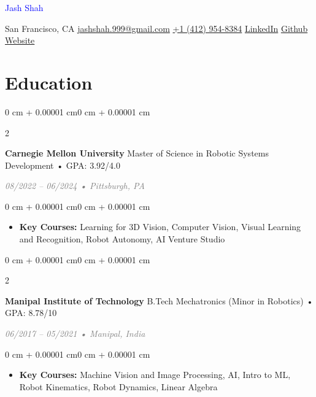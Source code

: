 \documentclass[10pt, a4paper]{article}
\newcommand{\customsection}[1]{%
    \section*{%
        \textbf{%
            \fontsize{11pt}{11pt}\selectfont
            \color{Blue}#1%
        }%
        \hspace{0.5em}\color{Blue}\hrulefill%
    }%
    \vspace{0.03cm}%
}
\newenvironment{highlights}{
    \begingroup
    \fontsize{9.3pt}{10.8pt}\selectfont
    \begin{itemize}[
        topsep=0.03cm,
        parsep=0.03cm,
        partopsep=0pt,
        itemsep=0pt,
        leftmargin=0cm + 8pt
    ]
}{
    \end{itemize}
    \endgroup
}
\newenvironment{onecolentry}{
    \begin{adjustwidth}{0 cm + 0.00001 cm}{0 cm + 0.00001 cm}
}{
    \end{adjustwidth}
}
\newenvironment{twocolentry}[2][]{
    \onecolentry
    \def\secondColumn{#2}
    \setcolumnwidth{\fill, 6.0 cm}
    \begin{paracol}{2}
}{
    \switchcolumn \raggedleft \secondColumn
    \end{paracol}
    \endonecolentry
}
\newenvironment{header}{
    \setlength{\topsep}{0pt}\par\kern\topsep\centering\linespread{0.8}
}{
    \par\kern\topsep
}
\begin{document}
    \begin{header}
        \fontsize{15pt}{15pt}\selectfont \textcolor{Blue}{Jash Shah}

        \vspace{5pt}

        \normalsize

        San Francisco, CA
        \textbullet{} \href{mailto:jashshah.999@gmail.com}{jashshah.999@gmail.com}
        \textbullet{} \href{tel:+14129548384}{+1 (412) 954-8384}
        \textbullet{} \href{https://linkedin.com/in/jash-shah-2b790146}{LinkedIn}
        \textbullet{} \href{https://github.com/jashshah999}{Github}
        \textbullet{} \href{https://jashshah999.github.io}{Website}
    \end{header}

    \vspace{3pt}

\customsection{Education}

\begin{twocolentry}{
    {\small\textcolor{gray}{\textit{08/2022 – 06/2024 • Pittsburgh, PA}}}
}
    \textbf{Carnegie Mellon University} \newline
    {\small Master of Science in Robotic Systems Development • GPA: 3.92/4.0}
\end{twocolentry}
\vspace{0.08cm}
\begin{onecolentry}
    \begin{highlights}
        \item \textbf{Key Courses:} Learning for 3D Vision, Computer Vision, Visual Learning and Recognition, Robot Autonomy, AI Venture Studio
    \end{highlights}
\end{onecolentry}
\vspace{0.15cm}

\begin{twocolentry}{
    {\small\textcolor{gray}{\textit{06/2017 – 05/2021 • Manipal, India}}}
}
    \textbf{Manipal Institute of Technology} \newline
    {\small B.Tech Mechatronics (Minor in Robotics) • GPA: 8.78/10}
\end{twocolentry}
\vspace{0.08cm}
\begin{onecolentry}
    \begin{highlights}
        \item \textbf{Key Courses:} Machine Vision and Image Processing, AI, Intro to ML, Robot Kinematics, Robot Dynamics, Linear Algebra
    \end{highlights}
\end{onecolentry}
\end{document}
